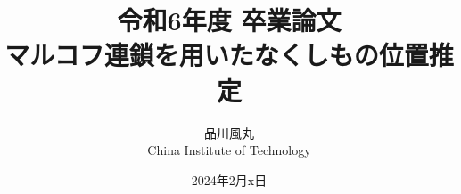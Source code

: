 \documentclass[a4paper,11pt]{jsbook}
\begin{document}
\title{令和6年度 卒業論文\\
マルコフ連鎖を用いたなくしもの位置推定}

\author{品川風丸 \\
China Institute of Technology}

\date{2024年2月x日}

\maketitle

\clearpage




\tableofcontents



\cleardoublepage
{}






\appendix





\newpage
\printindex
\end{document}
